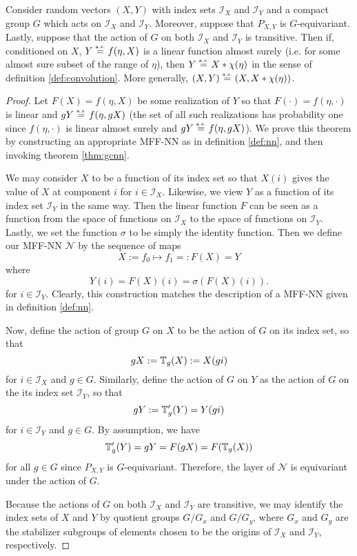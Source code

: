 \documentclass[10pt]{article}
\begin{document}
\begin{theorem} \label{thm:convolution}
	Consider random vectors $(X,Y)$ with index sets $\mathcal{I}_X$ and $\mathcal{I}_Y$ and a compact group $G$ which acts on $\mathcal{I}_X$ and $\mathcal{I}_Y$.
	Moreover, suppose that $P_{X,Y}$ is $G$-equivariant.
	Lastly, suppose that the action of $G$ on both $\mathcal{I}_X$ and $\mathcal{I}_Y$ is transitive.
	Then if, conditioned on $X$, $Y \stackrel{\text{\rm\tiny a.s.}}{=} f(\eta, X)$ is a linear function almost surely (i.e. for some almost sure subset of the range of $\eta$), then $Y \stackrel{\text{\rm\tiny a.s.}}{=} X * \chi(\eta)$ in the sense of definition \ref{def:convolution}.
	More generally, $(X,Y) \stackrel{\text{\rm\tiny a.s.}}{=} (X,X * \chi(\eta))$.
\end{theorem}
\begin{proof}
Let $F(X) = f(\eta, X)$ be some realization of $Y$ so that $F(\cdot) = f(\eta, \cdot)$ is linear and $gY \stackrel{\text{\rm\tiny a.s.}}{=} f(\eta,gX)$ (the set of all such realizations has probability one since $f(\eta, \cdot)$ is linear almost surely and $gY \stackrel{\text{\rm\tiny a.s.}}{=} f(\eta,gX)$).
We prove this theorem by constructing an appropriate MFF-NN as in definition \ref{def:nn}, and then invoking theorem \ref{thm:gcnn}.

We may consider $X$ to be a function of its index set so that $X(i)$ gives the value of $X$ at component $i$ for $i \in \mathcal{I}_X$.
Likewise, we view $Y$ as a function of its index set $\mathcal{I}_{Y}$ in the same way.
Then the linear function $F$ can be seen as a function from the space of functions on $\mathcal{I}_{X}$ to the space of functions on $\mathcal{I}_Y$.
Lastly, we set the function $\sigma$ to be simply the identity function.
Then we define our MFF-NN $\mathcal{N}$ by the sequence of maps
$$
	X := f_0 \mapsto f_1 =: F(X) = Y
$$
where
$$
	Y(i) = F(X)(i) = \sigma(F(X)(i)).
$$
for $i \in \mathcal{I}_Y$.
Clearly, this construction matches the description of a MFF-NN given in definition \ref{def:nn}.

Now, define the action of group $G$ on $X$ to be the action of $G$ on its index set, so that
$$
	gX := \mathbb{T}_g(X) := X(gi)
$$
for $i \in \mathcal{I}_{X}$ and $g \in G$.
Similarly, define the action of $G$ on $Y$ as the action of $G$ on the its index set $\mathcal{I}_Y$, so that
$$
	gY := \mathbb{T}'_g(Y) = Y(g i)
$$
for $i \in \mathcal{I}_{Y}$ and $g \in G$.
By assumption, we have
$$
	\mathbb{T}'_g(Y) = gY = F(gX) = F(\mathbb{T}_g(X))
$$
for all $g \in G$ since $P_{X,Y}$ is $G$-equivariant.
Therefore, the layer of $\mathcal{N}$ is equivariant under the action of $G$.

Because the actions of $G$ on both $\mathcal{I}_{X}$ and $\mathcal{I}_{Y}$ are transitive, we may identify the index sets of $X$ and $Y$ by quotient groups $G/G_x$ and $G/G_y$, where $G_x$ and $G_y$ are the stabilizer subgroups of elements chosen to be the origins of $\mathcal{I}_X$ and $\mathcal{I}_Y$, respectively.


\end{proof}
\end{document}
